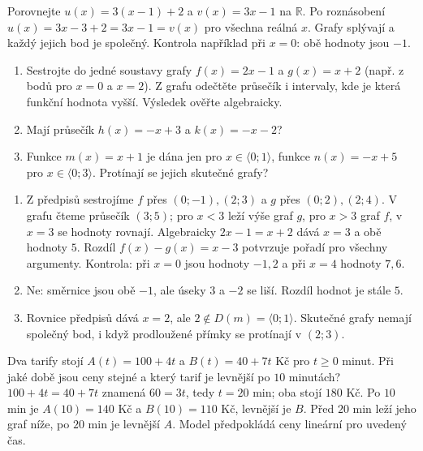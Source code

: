 \documentclass[11pt,a4paper]{article}
\begin{document}
\begin{prikladReseniBox}[title={Příklad 3}]
Porovnejte $u(x)=3(x-1)+2$ a $v(x)=3x-1$ na $\mathbb R$.
\tcblower
Po roznásobení $u(x)=3x-3+2=3x-1=v(x)$ pro všechna reálná $x$. Grafy splývají a každý jejich bod je společný. Kontrola například při $x=0$: obě hodnoty jsou $-1$.
\end{prikladReseniBox}
\begin{zadaniReseniBox}[title={Samostatná práce 1}]
\begin{enumerate}[label=\alph*)]
\item Sestrojte do jedné soustavy grafy $f(x)=2x-1$ a $g(x)=x+2$ (např. z bodů pro $x=0$ a $x=2$). Z grafu odečtěte průsečík i intervaly, kde je která funkční hodnota vyšší. Výsledek ověřte algebraicky.
\item Mají průsečík $h(x)=-x+3$ a $k(x)=-x-2$?
\item Funkce $m(x)=x+1$ je dána jen pro $x\in\langle0;1\rangle$, funkce $n(x)=-x+5$ pro $x\in\langle0;3\rangle$. Protínají se jejich skutečné grafy?
\end{enumerate}
\tcblower
\begin{enumerate}[label=\alph*)]
\item Z předpisů sestrojíme $f$ přes $(0;-1),(2;3)$ a $g$ přes $(0;2),(2;4)$. V grafu čteme průsečík $(3;5)$; pro $x<3$ leží výše graf $g$, pro $x>3$ graf $f$, v $x=3$ se hodnoty rovnají. Algebraicky $2x-1=x+2$ dává $x=3$ a obě hodnoty $5$. Rozdíl $f(x)-g(x)=x-3$ potvrzuje pořadí pro všechny argumenty. Kontrola: při $x=0$ jsou hodnoty $-1,2$ a při $x=4$ hodnoty $7,6$.
\item Ne: směrnice jsou obě $-1$, ale úseky $3$ a $-2$ se liší. Rozdíl hodnot je stále $5$.
\item Rovnice předpisů dává $x=2$, ale $2\notin D(m)=\langle0;1\rangle$. Skutečné grafy nemají společný bod, i když prodloužené přímky se protínají v $(2;3)$.
\end{enumerate}
\end{zadaniReseniBox}
\begin{zadaniReseniBox}[title={Rozšíření 1}]
Dva tarify stojí $A(t)=100+4t$ a $B(t)=40+7t$ Kč pro $t\ge0$ minut. Při jaké době jsou ceny stejné a který tarif je levnější po $10$ minutách?
\tcblower
$100+4t=40+7t$ znamená $60=3t$, tedy $t=20$ min; oba stojí $180$ Kč. Po $10$ min je $A(10)=140$ Kč a $B(10)=110$ Kč, levnější je $B$. Před $20$ min leží jeho graf níže, po $20$ min je levnější $A$. Model předpokládá ceny lineární pro uvedený čas.
\end{zadaniReseniBox}
\end{document}
